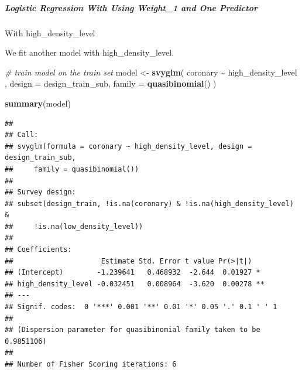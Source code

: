 \documentclass[
]{article}
\newenvironment{Shaded}{\begin{snugshade}}{\end{snugshade}}
\newcommand{\AttributeTok}[1]{\textcolor[rgb]{0.13,0.29,0.53}{#1}}
\newcommand{\CommentTok}[1]{\textcolor[rgb]{0.56,0.35,0.01}{\textit{#1}}}
\newcommand{\FunctionTok}[1]{\textcolor[rgb]{0.13,0.29,0.53}{\textbf{#1}}}
\newcommand{\NormalTok}[1]{#1}
\newcommand{\OtherTok}[1]{\textcolor[rgb]{0.56,0.35,0.01}{#1}}
\newcommand{\SpecialCharTok}[1]{\textcolor[rgb]{0.81,0.36,0.00}{\textbf{#1}}}
\newcommand{\StringTok}[1]{\textcolor[rgb]{0.31,0.60,0.02}{#1}}
\begin{document}
\subparagraph{Logistic Regression With Using Weight\_1 and One
Predictor}\label{logistic-regression-with-using-weight_1-and-one-predictor}

With high\_density\_level

We fit another model with high\_density\_level.

\begin{Shaded}
\begin{Highlighting}[]
\CommentTok{\# train model on the train set}
\NormalTok{model }\OtherTok{\textless{}{-}} \FunctionTok{svyglm}\NormalTok{(}
\NormalTok{  coronary }\SpecialCharTok{\textasciitilde{}}\NormalTok{ high\_density\_level ,}
  \AttributeTok{design =}\NormalTok{ design\_train\_sub,}
  \AttributeTok{family =} \FunctionTok{quasibinomial}\NormalTok{()}
\NormalTok{)}

\FunctionTok{summary}\NormalTok{(model)}
\end{Highlighting}
\end{Shaded}

\begin{verbatim}
## 
## Call:
## svyglm(formula = coronary ~ high_density_level, design = design_train_sub, 
##     family = quasibinomial())
## 
## Survey design:
## subset(design_train, !is.na(coronary) & !is.na(high_density_level) & 
##     !is.na(low_density_level))
## 
## Coefficients:
##                     Estimate Std. Error t value Pr(>|t|)   
## (Intercept)        -1.239641   0.468932  -2.644  0.01927 * 
## high_density_level -0.032451   0.008964  -3.620  0.00278 **
## ---
## Signif. codes:  0 '***' 0.001 '**' 0.01 '*' 0.05 '.' 0.1 ' ' 1
## 
## (Dispersion parameter for quasibinomial family taken to be 0.9851106)
## 
## Number of Fisher Scoring iterations: 6
\end{verbatim}

\begin{Shaded}
\end{Shaded}
\end{document}
